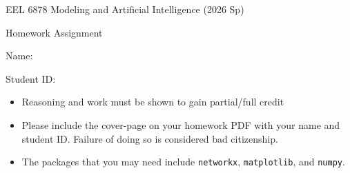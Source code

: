 \documentclass[11pt]{exam}
\begin{document}
\centerline{\Large \sc EEL 6878 Modeling and Artificial Intelligence (2026 Sp)}
\centerline{\Large \sc Homework Assignment}
\pagestyle{empty}

\hrulefill

\vspace{2cm}

{\Large \sc Name:}

\vspace{2cm}

{\Large \sc Student ID:}

\vspace{6cm}

\begin{itemize}
  \item Reasoning and work must be shown to gain partial/full credit
  \item Please include the cover-page on your homework PDF with your name and student ID. Failure of doing so is considered bad citizenship.
  \item The packages that you may need include \texttt{networkx}, \texttt{matplotlib}, and \texttt{numpy}.
\end{itemize}

\clearpage
\end{document}
